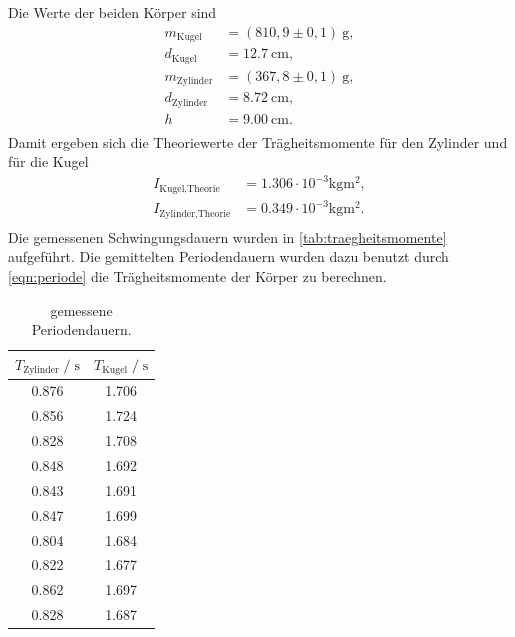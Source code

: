 
\sloppy Die Werte der beiden Körper sind
\begin{align*}
  m_{\text{Kugel}} &= (810,9 \pm 0,1)\:\si{\gram}, \\
  d_{\text{Kugel}} &= \SI{12,7}{\centi\meter}, \\
  m_{\text{Zylinder}} &= (367,8\pm 0,1)\:\si{\gram}, \\
  d_{\text{Zylinder}} &=  \SI{8,72}{\centi\meter}, \\
  h &= \SI{9,00}{\centi\meter}. \\
\end{align*}
Damit ergeben sich die Theoriewerte der Trägheitsmomente für den Zylinder und für die Kugel
\begin{align*}
  I_{\text{Kugel,Theorie}} &= 1.306 \cdot 10^{-3} \si{\kilogram\meter^2}, \\
  I_{\text{Zylinder,Theorie}} &= 0.349 \cdot 10^{-3} \si{\kilogram\meter^2}. \\
\end{align*}
Die gemessenen Schwingungsdauern wurden in \autoref{tab:traegheitsmomente} aufgeführt. Die gemittelten Periodendauern wurden dazu benutzt
durch \autoref{eqn:periode} die Trägheitsmomente der Körper zu berechnen.

\begin{table}[H]
  \centering
   \caption{gemessene Periodendauern.}
   \label{tab:traegheitsmomente}
   \begin{tabular}{c c}
      \toprule
      $ T_{\text{Zylinder}} \;/\; \si{\second}$ & $ T_{\text{Kugel}} \;/\; \si{\second}$ \\
      \midrule
      0.876 & 1.706 \\
      0.856 & 1.724 \\
      0.828 & 1.708 \\
      0.848 & 1.692 \\
      0.843 & 1.691 \\
      0.847 & 1.699 \\
      0.804 & 1.684 \\
      0.822 & 1.677 \\
      0.862 & 1.697 \\
      0.828 & 1.687 \\
      \bottomrule
   \end{tabular}
\end{table}

